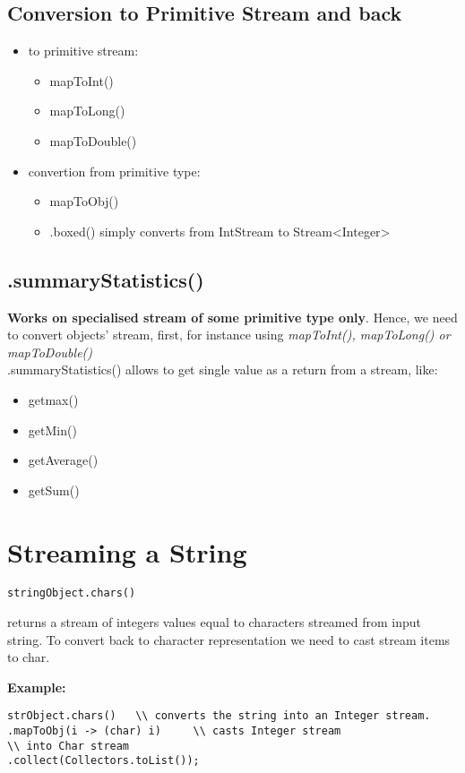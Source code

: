 \documentclass{report}
\begin{document}
\section{Conversion to Primitive Stream and back}
\begin{itemize}
	\item to primitive stream:
	\begin{itemize}
		\item mapToInt()
		\item mapToLong()
		\item  mapToDouble()
	\end{itemize}
	
	\item convertion from primitive type:
	\begin{itemize}
		\item mapToObj()
		\item .boxed() simply converts from IntStream to Stream\textless Integer\textgreater
	\end{itemize}
\end{itemize}

\section{.summaryStatistics()}
\textbf{Works on specialised stream of some primitive type only}. Hence, we need to convert objects' stream, first,
for instance using \textit{mapToInt(), mapToLong() or mapToDouble()}\\
.summaryStatistics() allows to get single value as a return from a stream, like:
\begin{itemize}
	\item getmax()
	\item getMin()
	\item getAverage()
	\item getSum()
\end{itemize}

\chapter{Streaming a String}
\begin{verbatim}
stringObject.chars()
\end{verbatim}
returns a stream of integers values equal to characters streamed from input string. To convert back to 
character representation we need to cast stream items to char.

\textbf{Example:}
\begin{verbatim}
strObject.chars()   \\ converts the string into an Integer stream.
.mapToObj(i -> (char) i)     \\ casts Integer stream 
\\ into Char stream
.collect(Collectors.toList());
\end{verbatim}
\end{document}

